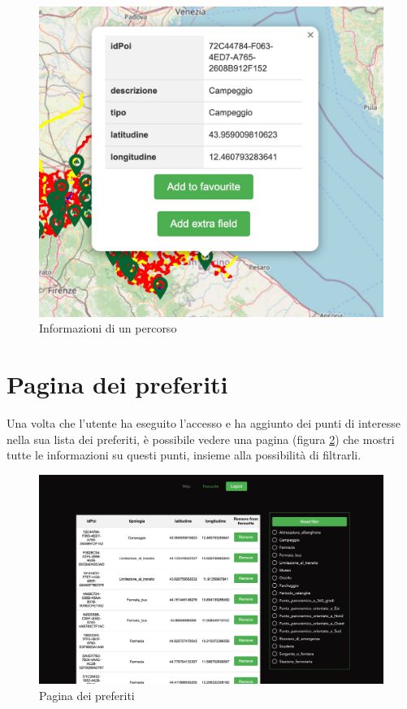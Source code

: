 \begin{figure}[h]
\begin{center} 
\includegraphics[width=12cm]{images/Info punto.jpg}
\caption[Informazioni di un percorso]{Informazioni di un percorso}\label{fig:info_punto}
\end{center}
\end{figure}

\section{Pagina dei preferiti}

Una volta che l'utente ha eseguito l'accesso e ha aggiunto dei punti di interesse nella sua lista dei preferiti, è possibile vedere una pagina (figura \ref{fig:preferiti}) che mostri tutte le informazioni su questi punti, insieme alla possibilità di filtrarli.

\begin{figure}[h]
\begin{center} 
\includegraphics[width=13cm]{images/Favourite page.jpg}
\caption[Pagina dei preferiti]{Pagina dei preferiti}\label{fig:preferiti}
\end{center}
\end{figure}


